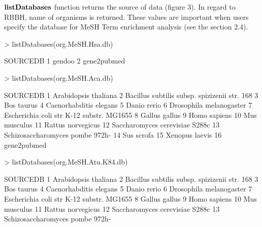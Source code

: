 \documentclass[11pt]{article}
\begin{document}
$\bf{listDatabases}$ function returns the source of data (figure 3). In regard to RBBH, name of organisms is returned. These values are important when users specify the database for MeSH Term enrichment analysis (see the section 2.4).

\begin{center}
\begin{Schunk}
\begin{Sinput}
> listDatabases(org.MeSH.Hsa.db)
\end{Sinput}
\begin{Soutput}
     SOURCEDB
1      gendoo
2 gene2pubmed
\end{Soutput}
\begin{Sinput}
> listDatabases(org.MeSH.Aca.db)
\end{Sinput}
\begin{Soutput}
                                       SOURCEDB
1                          Arabidopsis thaliana
2  Bacillus subtilis subsp. spizizenii str. 168
3                                    Bos taurus
4                        Caenorhabditis elegans
5                                   Danio rerio
6                       Drosophila melanogaster
7      Escherichia coli str K-12 substr. MG1655
8                                 Gallus gallus
9                                  Homo sapiens
10                                 Mus musculus
11                            Rattus norvegicus
12               Saccharomyces cerevisiae S288c
13              Schizosaccharomyces pombe 972h-
14                                   Sus scrofa
15                               Xenopus laevis
16                                  gene2pubmed
\end{Soutput}
\begin{Sinput}
> listDatabases(org.MeSH.Atu.K84.db)
\end{Sinput}
\begin{Soutput}
                                       SOURCEDB
1                          Arabidopsis thaliana
2  Bacillus subtilis subsp. spizizenii str. 168
3                                    Bos taurus
4                        Caenorhabditis elegans
5                                   Danio rerio
6                       Drosophila melanogaster
7      Escherichia coli str K-12 substr. MG1655
8                                 Gallus gallus
9                                  Homo sapiens
10                                 Mus musculus
11                            Rattus norvegicus
12               Saccharomyces cerevisiae S288c
13              Schizosaccharomyces pombe 972h-

\end{Soutput}
\end{Schunk}
\end{center}
\end{document}
